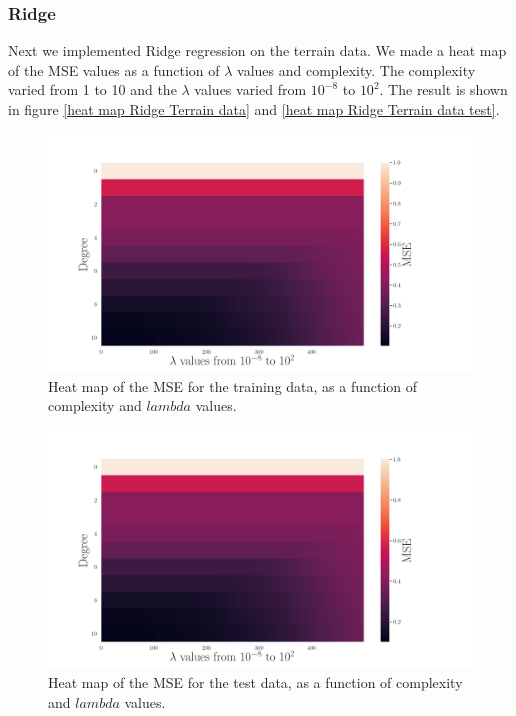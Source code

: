 \subsubsection{Ridge}
\noindent Next we implemented Ridge regression on the terrain data. We made a heat map of the MSE values as a function of $\lambda$ values and complexity. The complexity varied from 1 to 10 and the $\lambda$ values varied from $10^{-8}$ to $10^{2}$. The result is shown in figure \eqref{heat map Ridge Terrain data} and \eqref{heat map Ridge Terrain data test}.
\begin{figure}[H]
	\centering
	\includegraphics[width=\linewidth]{images/Figure_22.png}
	\caption{Heat map of the MSE for the training data, as a function of complexity and $lambda$ values.}
	\label{heat map Ridge Terrain data}
\end{figure}
%
\begin{figure}[H]
	\centering
	\includegraphics[width=\linewidth]{images/Figure_23.png}
	\caption{Heat map of the MSE for the test data, as a function of complexity and $lambda$ values.}
	\label{heat map Ridge Terrain data test}
\end{figure}
